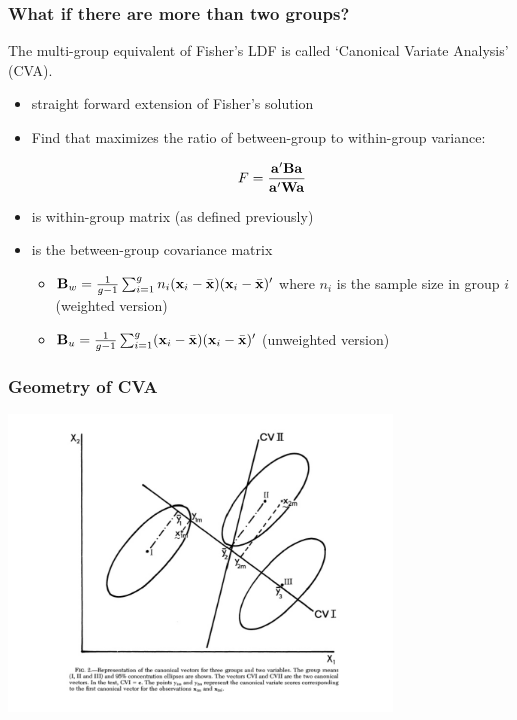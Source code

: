 \documentclass{beamer}
\begin{document}
\begin{frame}
  \frametitle{What if there are more than two groups?}

The multi-group equivalent of Fisher's LDF is called `Canonical Variate Analysis' (CVA).

\begin{itemize}
\item straight forward extension of Fisher's solution
\item Find  that maximizes the ratio of between-group to within-group variance:

\[
F = \frac{\mathbf{a}'\mathbf{B}\mathbf{a}}{\mathbf{a}'\mathbf{W}\mathbf{a}}
\]

\item {} is within-group matrix (as defined previously)
\item {} is the between-group covariance matrix
\begin{itemize}
    \item $\mathbf{B}_w = \frac{1}{g-1}\sum_{i=1}^{g} n_i(\mathbf{x}_i - \bar{\mathbf{x}})(\mathbf{x}_i - \bar{\mathbf{x}})'$ where $n_i$ is the sample size in group $i$ (weighted version)
    \item  $\mathbf{B}_u = \frac{1}{g-1}\sum_{i=1}^{g} (\mathbf{x}_i - \bar{\mathbf{x}})(\mathbf{x}_i - \bar{\mathbf{x}})'$ (unweighted version)
\end{itemize}

\end{itemize}

\end{frame}

\begin{frame}
  \frametitle{Geometry of CVA}
  
\begin{center}
\includegraphics[height=3.1in]{3group}
\end{center}

\end{frame}
\end{document}
